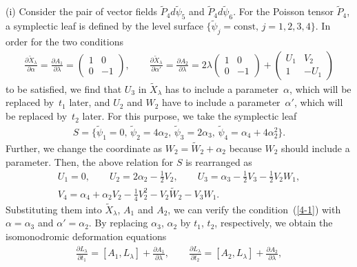 \documentclass[10pt,a4paper]{amsart}
\numberwithin{equation}{section}
\begin{document}
(i) Consider the pair of vector f\/ields $\widetilde{P}_4 d\widetilde{\psi}_5$ and $\widetilde{P}_4 d\widetilde{\psi}_6$. For the Poisson tensor $\widetilde{P}_4$, a symplectic leaf is def\/ined by the level surface
$\{ \widetilde{\psi}_j = \text{const},\, j=1,2,3,4\}$.
In order for the two conditions
\begin{gather}
\frac{\partial \widetilde{X}_\lambda }{\partial \alpha } = \frac{\partial A_1 }{\partial \lambda } = \left(
\begin{matrix}
1 & 0 \\
0 & -1
\end{matrix}
\right), \qquad
\frac{\partial \widetilde{X}_\lambda }{\partial \alpha' } = \frac{\partial A_2 }{\partial \lambda } = 2\lambda \left(
\begin{matrix}
1 & 0 \\
0 & -1
\end{matrix}
\right) + \left(
\begin{matrix}
U_1 & V_2 \\
1 & -U_1
\end{matrix}
\right)
\label{4-1}
\end{gather}
to be satisf\/ied, we f\/ind that $U_3$ in $\widetilde{X}_\lambda $ has to include a parameter~$\alpha $, which will be replaced by~$t_1$ later,
and $U_2$ and $W_2$ have to include a parameter~$\alpha' $, which will be replaced by~$t_2$ later. For this purpose, we take the symplectic leaf
\begin{gather*}
S = \big\{ \widetilde{\psi}_1 = 0,\, \widetilde{\psi}_2 = 4\alpha _2 ,\, \widetilde{\psi}_3 = 2\alpha _3,\,
\widetilde{\psi}_4 = \alpha _4 + 4\alpha _2^2 \big\}.
\end{gather*}
Further, we change the coordinate as $W_2 = \widetilde{W}_2 + \alpha _2$ because $W_2$ should include a parameter. Then, the above relation for $S$ is rearranged as
\begin{gather*}
 U_1 = 0,\qquad U_2 = 2\alpha _2-\frac{1}{2}V_2,\qquad U_3 = \alpha _3-\frac{1}{2}V_3-\frac{1}{2}V_2W_1, \\
 V_4 = \alpha _4 + \alpha _2V_2 - \frac{1}{4}V_2^2 - V_2\widetilde{W}_2 - V_3W_1.
\end{gather*}
Substituting them into $\widetilde{X}_\lambda$, $A_1$ and $A_2$, we can verify the condition~(\ref{4-1}) with $\alpha = \alpha _3$ and $\alpha ' = \alpha _2$. By replacing $\alpha _3$, $\alpha _2$ by $t_1$, $t_2$, respectively, we obtain the isomonodromic deformation equations
\begin{gather}
\frac{\partial L_\lambda }{\partial t_1} = [A_1, L_\lambda ]+ \frac{\partial A_1}{\partial \lambda }, \qquad
\frac{\partial L_\lambda }{\partial t_2} = [A_2, L_\lambda ]+ \frac{\partial A_2}{\partial \lambda },
\label{PDE}
\end{gather}
\end{document}
